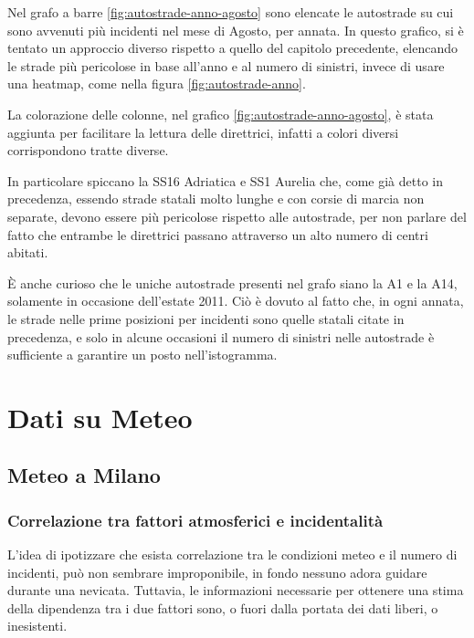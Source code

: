 \documentclass[a4paper,12pt]{report}
\begin{document}
Nel grafo a barre \ref{fig:autostrade-anno-agosto} sono elencate le 
autostrade su cui sono avvenuti più incidenti nel mese di Agosto, per annata. 
In questo grafico, si è tentato un approccio diverso rispetto a quello del capitolo precedente, 
elencando le strade più pericolose in base all'anno e al numero di sinistri, invece di usare una 
heatmap, come nella figura \ref{fig:autostrade-anno}. 

La colorazione delle colonne, nel grafico \ref{fig:autostrade-anno-agosto}, è stata aggiunta per 
facilitare la lettura delle direttrici, infatti a colori diversi corrispondono tratte diverse. 

In particolare spiccano la SS16 Adriatica e SS1 Aurelia che, come già 
detto in precedenza, essendo strade statali molto lunghe e con corsie di marcia 
non separate, devono essere più pericolose rispetto alle autostrade, 
per non parlare del fatto che entrambe le direttrici passano attraverso un 
alto numero di centri abitati. 

\`E anche curioso che le uniche autostrade presenti nel grafo siano la A1 e la A14, 
solamente in occasione dell'estate 2011. 
Ciò è dovuto al fatto che, in ogni annata, le strade nelle prime posizioni per incidenti sono 
quelle statali citate in precedenza, e solo in alcune occasioni il numero di sinistri 
nelle autostrade è sufficiente a garantire un posto nell'istogramma. 

\chapter{Dati su Meteo}

\section{Meteo a Milano}

\subsection{Correlazione tra fattori atmosferici e incidentalità}

L'idea di ipotizzare che esista correlazione tra le condizioni meteo e il numero 
di incidenti, può non sembrare improponibile, in fondo nessuno adora guidare 
durante una nevicata. 
Tuttavia, le informazioni necessarie per ottenere una stima della dipendenza 
tra i due fattori sono, o fuori dalla portata dei dati liberi, o inesistenti. 
\end{document}
